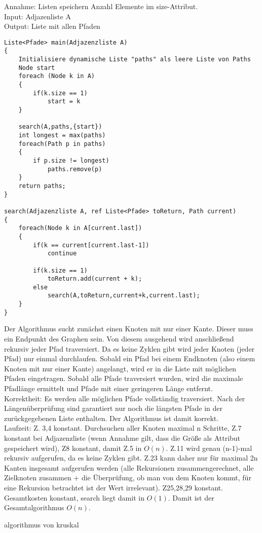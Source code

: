 \documentclass{scrartcl}
\newcommand{\loes}[2]{\medskip\noindent{{\bf Lösung zu Aufgabe #1}\\ {#2}}\vspace{0.5cm}}
\begin{document}
\loes{2}
{}
Annahme: Listen speichern Anzahl Elemente im size-Attribut. \\
Input: Adjazenliste A \\
Output: Liste mit allen Pfaden \\
\begin{lstlisting}
Liste<Pfade> main(Adjazenzliste A)
{
	Initialisiere dynamische Liste "paths" als leere Liste von Paths
	Node start
	foreach (Node k in A)
	{
		if(k.size == 1)
			start = k
	}
	
	search(A,paths,{start})
	int longest = max(paths)
	foreach(Path p in paths)
	{
		if p.size != longest)
			paths.remove(p)	
	} 
	return paths;
}

search(Adjazenzliste A, ref Liste<Pfade> toReturn, Path current)
{
	foreach(Node k in A[current.last])
	{
		if(k == current[current.last-1])
			continue
			
		if(k.size == 1)
			toReturn.add(current + k);
		else
			search(A,toReturn,current+k,current.last);	
	}
}
\end{lstlisting}

Der Algorithmus sucht zunächst einen Knoten mit nur einer Kante. Dieser muss ein Endpunkt des Graphen sein. Von diesem ausgehend wird anschließend rekursiv jeder Pfad traversiert. Da es keine Zyklen gibt wird jeder Knoten (jeder Pfad) nur einmal durchlaufen. Sobald ein Pfad bei einem Endknoten (also einem Knoten mit nur einer Kante) angelangt, wird er in die Liste mit möglichen Pfaden eingetragen. Sobald alle Pfade traversiert wurden, wird die maximale Pfadlänge ermittelt und Pfade mit einer geringeren Länge entfernt. \\
Korrektheit: Es werden alle möglichen Pfade vollständig traversiert. Nach der Längenüberprüfung sind garantiert nur noch die längsten Pfade in der zurückgegebenen Liste enthalten. Der Algorithmus ist damit korrekt. \\
Laufzeit: Z. 3,4 konstant. Durchsuchen aller Knoten maximal n Schritte, Z.7 konstant bei Adjazenzliste (wenn Annahme gilt, dass die Größe als Attribut gespeichert wird), Z8 konstant, damit Z.5 in $O(n)$. Z.11 wird genau (n-1)-mal rekursiv aufgerufen, da es keine Zyklen gibt. Z.23 kann daher nur für maximal 2n Kanten insgesamt aufgerufen werden (alle Rekursionen zusammengerechnet, alle Zielknoten zusammen + die Überprüfung, ob man von dem Knoten kommt, für eine Rekursion betrachtet ist der Wert irrelevant). Z25,28,29 konstant. Gesamtkosten konstant, search liegt damit in $O(1)$. Damit ist der Gesamtalgorithmus $O(n)$. 

algorithmus von kruskal
\end{document}
